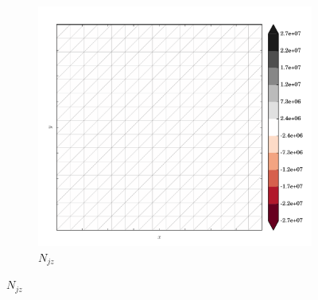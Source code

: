 \begin{figure}
  \begin{subfigure}[b]{0.3\linewidth}
    \includegraphics[width=\linewidth]{images/stress_balance/BP/N_jz.pdf}
  \caption{$N_{jz}$}
  \label{bp_N_jz}
  \end{subfigure}


\end{figure}
